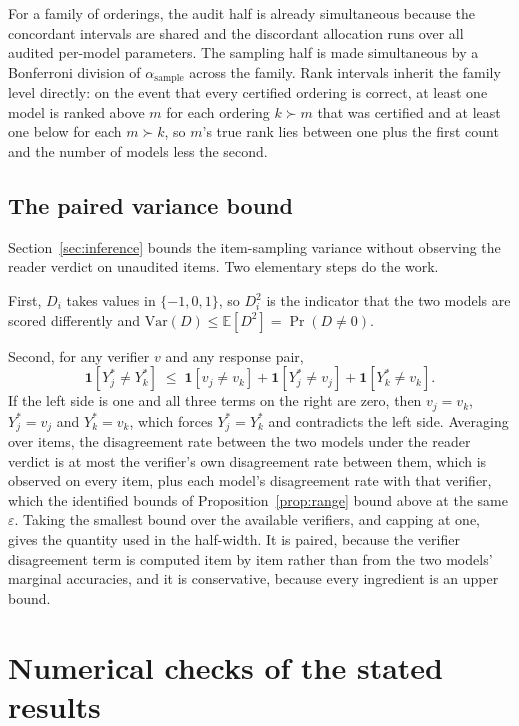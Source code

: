 For a family of orderings, the audit half is already simultaneous because the concordant
intervals are shared and the discordant allocation runs over all audited per-model parameters.
The sampling half is made simultaneous by a Bonferroni division of $\alpha_{\mathrm{sample}}$
across the family. Rank intervals inherit the family level directly: on the event that every
certified ordering is correct, at least one model is ranked above $m$ for each ordering
$k \succ m$ that was certified and at least one below for each $m \succ k$, so $m$'s true rank
lies between one plus the first count and the number of models less the second.

\subsection{The paired variance bound}
\label{app:paired}

Section~\ref{sec:inference} bounds the item-sampling variance without observing the reader
verdict on unaudited items. Two elementary steps do the work.

First, $D_i$ takes values in $\{-1,0,1\}$, so $D_i^2$ is the indicator that the two models are
scored differently and $\mathrm{Var}(D) \le \mathbb{E}[D^2] = \Pr(D \ne 0)$.

Second, for any verifier $v$ and any response pair,
\[
\mathbf{1}[Y^\ast_j \ne Y^\ast_k] \;\le\; \mathbf{1}[v_j \ne v_k] + \mathbf{1}[Y^\ast_j \ne v_j] + \mathbf{1}[Y^\ast_k \ne v_k] .
\]
If the left side is one and all three terms on the right are zero, then $v_j = v_k$,
$Y^\ast_j = v_j$ and $Y^\ast_k = v_k$, which forces $Y^\ast_j = Y^\ast_k$ and contradicts the
left side. Averaging over items, the disagreement rate between the two models under the reader
verdict is at most the verifier's own disagreement rate between them, which is observed on
every item, plus each model's disagreement rate with that verifier, which the identified
bounds of Proposition~\ref{prop:range} bound above at the same $\varepsilon$. Taking the
smallest bound over the available verifiers, and capping at one, gives the quantity used in
the half-width. It is paired, because the verifier disagreement term is computed item by item
rather than from the two models' marginal accuracies, and it is conservative, because every
ingredient is an upper bound.

\section{Numerical checks of the stated results}
\label{app:tests}

